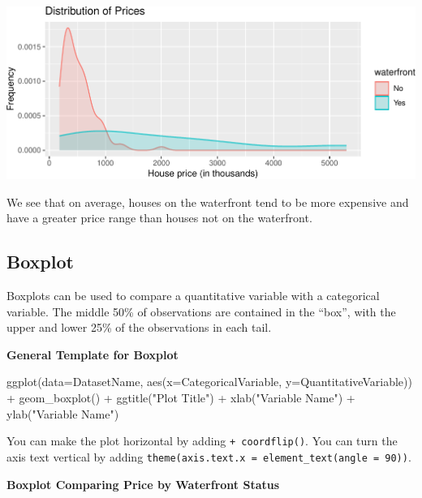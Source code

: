 \documentclass[
  letterpaper,
  DIV=11,
  numbers=noendperiod]{scrreprt}
\newenvironment{Shaded}{\begin{snugshade}}{\end{snugshade}}
\newcommand{\AttributeTok}[1]{\textcolor[rgb]{0.40,0.45,0.13}{#1}}
\newcommand{\FunctionTok}[1]{\textcolor[rgb]{0.28,0.35,0.67}{#1}}
\newcommand{\NormalTok}[1]{\textcolor[rgb]{0.00,0.23,0.31}{#1}}
\newcommand{\SpecialCharTok}[1]{\textcolor[rgb]{0.37,0.37,0.37}{#1}}
\newcommand{\StringTok}[1]{\textcolor[rgb]{0.13,0.47,0.30}{#1}}
\begin{document}
\includegraphics{Ch1_files/figure-pdf/unnamed-chunk-17-1.pdf}

We see that on average, houses on the waterfront tend to be more
expensive and have a greater price range than houses not on the
waterfront.

\subsection{Boxplot}\label{boxplot}

Boxplots can be used to compare a quantitative variable with a
categorical variable. The middle 50\% of observations are contained in
the ``box'', with the upper and lower 25\% of the observations in each
tail.

\textbf{General Template for Boxplot}

\begin{Shaded}
\begin{Highlighting}[]
\FunctionTok{ggplot}\NormalTok{(}\AttributeTok{data=}\NormalTok{DatasetName, }\FunctionTok{aes}\NormalTok{(}\AttributeTok{x=}\NormalTok{CategoricalVariable, }
                             \AttributeTok{y=}\NormalTok{QuantitativeVariable)) }\SpecialCharTok{+} 
  \FunctionTok{geom\_boxplot}\NormalTok{() }\SpecialCharTok{+} 
  \FunctionTok{ggtitle}\NormalTok{(}\StringTok{"Plot Title"}\NormalTok{) }\SpecialCharTok{+} 
  \FunctionTok{xlab}\NormalTok{(}\StringTok{"Variable Name"}\NormalTok{) }\SpecialCharTok{+} \FunctionTok{ylab}\NormalTok{(}\StringTok{"Variable Name"}\NormalTok{) }
\end{Highlighting}
\end{Shaded}

You can make the plot horizontal by adding \texttt{+\ coordflip()}. You
can turn the axis text vertical by adding
\texttt{theme(axis.text.x\ =\ element\_text(angle\ =\ 90))}.

\textbf{Boxplot Comparing Price by Waterfront Status}
\end{document}
